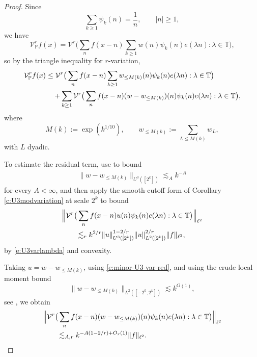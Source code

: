 \documentclass[12pt]{amsart}
\numberwithin{equation}{section}
\theoremstyle{definition}
\begin{document}
\begin{proof}
Since
\[
    \sum_{k\geq1}\psi_k(n)=\frac1n,
    \qquad |n|\geq1,
\]
we have
\[
    \mathcal V_{\mathbb P}^{r}f(x)
    =
    \mathcal{V}^r\big(
    \sum_n f(x-n)\sum_{k\geq 1} w(n)\psi_k(n)e(\lambda n):
    \lambda\in\mathbb T
    \big),
\]
so by the triangle inequality for \(r\)-variation,
\begin{align}
    \mathcal V_{\mathbb P}^{r}f(x)
    &\leq
    \mathcal{V}^r\big(
    \sum_n f(x-n)\sum_{k \geq 1} w_{\leq M(k)}(n)\psi_k(n)e(\lambda n):
    \lambda\in\mathbb T
    \big)
    \notag\\
    &\quad+
    \sum_{k\geq1}
    \mathcal{V}^r\big(
    \sum_n f(x-n)(w-w_{\leq M(k)})(n)\psi_k(n)e(\lambda n):
    \lambda\in\mathbb T
    \big),
\end{align}
where
\[
    M(k):=\exp(k^{1/10}),
    \qquad
    w_{\leq M(k)}:=\sum_{L\leq M(k)}w_L,
\]
with \(L\) dyadic.

To estimate the residual term, use \cite[Proposition 3.1]{F+} to bound
\begin{align}\label{e:minor-U3-var-red}
    \|w-w_{\leq M(k)}\|_{U^3([2^k])}
    \lesssim_A k^{-A}
\end{align}
for every \(A<\infty\), and then apply the smooth-cutoff form of Corollary
\ref{c:U3modvariation} at scale \(2^k\) to bound
\begin{align}\label{e:local-U3-var-red}
    &\Big\|
    \mathcal{V}^r\big(
    \sum_n f(x-n)u(n)\psi_k(n)e(\lambda n):\lambda\in\mathbb T
    \big)
    \Big\|_{\ell^2}
    \notag\\
    &\qquad\lesssim_{r}
    k^{2/r}
    \|u\|_{U^3([2^k])}^{1-2/r}
    \|u\|_{L^2([2^k])}^{2/r}
    \|f\|_{\ell^2},
\end{align}
by \eqref{e:U3varlambda} and convexity.

Taking \(u=w-w_{\leq M(k)}\), using \eqref{e:minor-U3-var-red}, and using the crude local moment bound
\[
    \|w-w_{\leq M(k)}\|_{L^2([-2^k,2^k])}
    \lesssim k^{O(1)},
\]
see \cite[Lemma 3.1]{FKT1}, we obtain
\begin{align}\label{e:minor-var-L2-red}
    &\Big\|
    \mathcal{V}^r\big(
    \sum_n f(x-n)(w-w_{\leq M(k)})(n)\psi_k(n)e(\lambda n):
    \lambda\in\mathbb T
    \big)
    \Big\|_{\ell^2}
    \notag\\
    &\qquad\lesssim_{A,r}
    k^{-A(1-2/r)+O_r(1)}
    \|f\|_{\ell^2}.
\end{align}


\end{proof}
\end{document}
